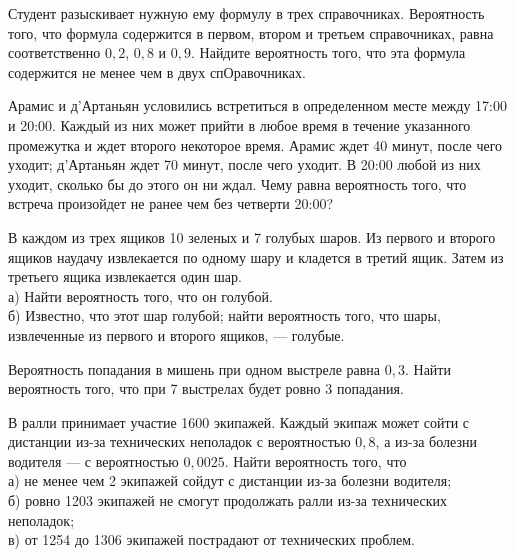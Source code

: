 \newpage\setcounter{zad}{0}



\begin{zkrW}{20}\noindent 
	Студент разыскивает нужную ему формулу в трех справочниках. Вероятность того, что формула содержится в первом, втором и третьем справочниках, равна соответственно $0{,}2$, $0{,}8$ и $0{,}9$. Найдите вероятность того, что эта формула содержится не менее чем в двух спОравочниках.
 
\end{zkrW}

\begin{zkrW}{20}\noindent 
	Арамис и д'Артаньян условились встретиться в определенном месте между 17:00 и 20:00. Каждый из них может прийти в любое время в течение указанного промежутка и ждет второго некоторое время. Арамис ждет 40 минут, после чего уходит; д'Артаньян ждет 70 минут, после чего уходит. В 20:00 любой из них уходит, сколько бы до этого он ни ждал. Чему равна вероятность того, что встреча произойдет не ранее чем без четверти 20:00?
 
\end{zkrW}

\begin{zkrW}{20}\noindent 
	В каждом из трех ящиков 10 зеленых и 7 голубых шаров. Из первого и второго ящиков наудачу извлекается по одному шару и кладется в третий ящик. Затем из третьего ящика извлекается один шар. \\ \indent а) Найти вероятность того, что он голубой. \\ \indent б) Известно, что этот шар голубой; найти вероятность того, что шары, извлеченные из первого и второго ящиков, --- голубые.
 
\end{zkrW}

\begin{zkrW}{20}\noindent 
	Вероятность попадания в мишень при одном выстреле равна $0{,}3$. Найти вероятность того, что при 7 выстрелах будет ровно 3 попадания.
 
\end{zkrW}

\begin{zkrW}{20}\noindent 
	В ралли принимает участие 1600 экипажей. Каждый экипаж может сойти с дистанции из-за технических неполадок с вероятностью $0{,}8$, а из-за болезни водителя --- с вероятностью $0{,}0025$. Найти вероятность того, что \\ \indent а) не менее чем 2 экипажей сойдут с дистанции из-за болезни водителя; \\ \indent б) ровно 1203 экипажей не смогут продолжать ралли из-за технических неполадок; \\ \indent в) от 1254 до 1306 экипажей пострадают от технических проблем.
 
\end{zkrW}

